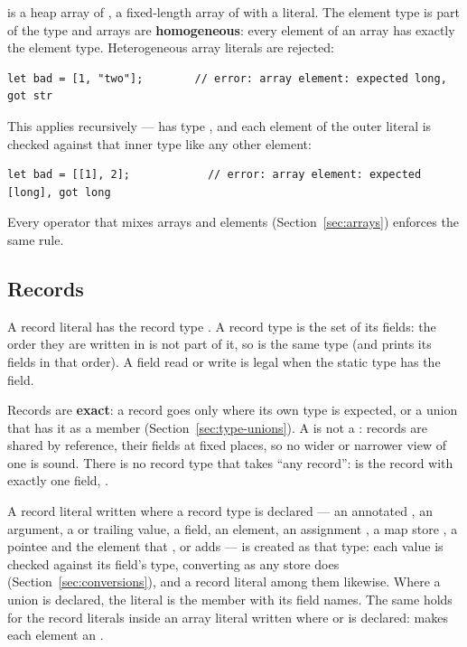 \ic{[T]} is a heap array of , \ic{[T; N]} a fixed-length array of
 with  a literal. The element type is part of the type and
arrays are \textbf{homogeneous}: every element of an array has exactly
the element type. Heterogeneous array literals are rejected:

\begin{lstlisting}
let bad = [1, "two"];        // error: array element: expected long, got str
\end{lstlisting}

\noindent This applies recursively --- \ic{[[1], [2]]} has type
\ic{[[long]]}, and each element of the outer literal is checked against that
inner type like any other element:

\begin{lstlisting}
let bad = [[1], 2];            // error: array element: expected [long], got long
\end{lstlisting}

\noindent Every operator that mixes arrays and elements
(Section~\ref{sec:arrays}) enforces the same rule.

\subsection{Records}
\label{sec:type-records}

A record literal  has the record type
. A record type is the set of its fields: the
order they are written in is not part of it, so
 is the same type (and prints its fields in
that order). A field read or write is legal when the static type has
the field.

Records are \textbf{exact}: a record goes only where its own type is
expected, or a union that has it as a member
(Section~\ref{sec:type-unions}). A  is not a
: records are shared by reference, their fields at
fixed places, so no wider or narrower view of one is sound. There is no
record type that takes ``any record'':  is the record
with exactly one field, .

A record literal written where a record type is declared --- an
annotated , an argument, a  or trailing value, a
field, an element, an assignment , a map store
, a pointee  and the element
that \ic{+=}, \ic{*=} or \ic{::} adds --- is created as that type: each
value is checked
against its field's type, converting as any store does
(Section~\ref{sec:conversions}), and a record literal among them
likewise. Where a union is declared, the literal is the member with its
field names. The same holds for the record literals inside an array
literal written where \ic{[T]} or \ic{[T; N]} is declared:
 makes each element an .

